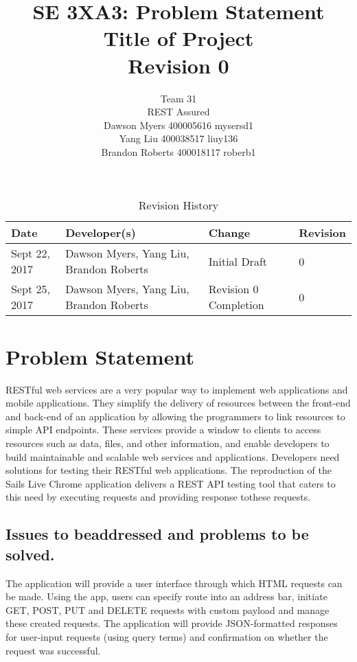 \documentclass{article}
\title{SE 3XA3: Problem Statement\\Title of Project\\Revision 0	}
\author{Team 31
		\\ REST Assured
		\\ Dawson Myers 400005616  mysersd1
		\\ Yang Liu 400038517 liuy136
		\\ Brandon Roberts 400018117 roberb1
}
\date{}
\begin{document}
\begin{table}[hp]
\caption{Revision History} \label{TblRevisionHistory}
\begin{tabularx}{\textwidth}{lXlX}
\toprule
\textbf{Date} & \textbf{Developer(s)} & \textbf{Change} & \textbf{Revision}\\
\midrule
Sept​ ​22,​ ​2017 & Dawson Myers, Yang Liu, Brandon Roberts & Initial Draft & 0\\
\hline
Sept​ ​25,​ ​2017 & Dawson Myers, Yang Liu, Brandon Roberts & Revision​ ​0​ ​Completion & 0\\
\hline
\bottomrule
\end{tabularx}
\end{table}

\newpage

\maketitle

\newpage
\section{Problem Statement}
RESTful web services are a very popular way to implement web applications and mobile applications. They simplify the delivery of resources between the front-end and back-end of an application by allowing the programmers to link resources to simple API endpoints. These services provide a window to clients to access resources such as data, files, and other information, and enable developers to build maintainable and scalable web services and            applications. Developers need solutions for testing their RESTful web applications. The reproduction of the Sails Live Chrome application delivers a REST API testing tool that caters to this​ ​need​ ​by​ ​executing​ ​requests​ ​and​ ​providing​ ​response​ ​to​ ​these​ ​requests.

\subsection{Issues​ ​to​ ​be​ ​addressed​ ​and​ ​problems​ ​to​ ​be​ ​solved.}

The application will provide a user interface through which HTML requests can be made. Using               the app, users can specify route into an address bar, initiate GET, POST, PUT and DELETE                requests with custom payload and manage these created requests. The application will provide             JSON-formatted responses for user-input requests (using query terms) and confirmation on           whether​ ​the​ ​request​ ​was​ ​successful. 
\end{document}

